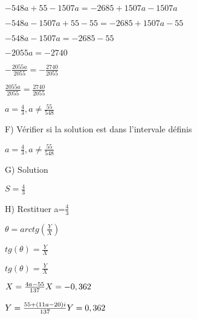 $
-548a+55-1507a = -2685+1507a-1507a
$
\vspace{5mm} %

$
-548a-1507a+55-55 = -2685+1507a-55
$
\vspace{5mm} %

$
-548a-1507a = -2685-55
$
\vspace{5mm} %

$
-2055a = -2740
$
\vspace{5mm} %

$
- \frac{2055a}{2055} = - \frac{2740}{2055}
$
\vspace{5mm} %

$
\frac{2055a}{2055} = \frac{2740}{2055}
$
\vspace{5mm} %

$
a=\frac{4}{3}, a \neq \frac{55}{548}
$
\vspace{10mm} %

F) Vérifier si la solution est dans l'intervale définis \\
\vspace{2mm} %

$
a=\frac{4}{3}, a \neq \frac{55}{548}
$
\vspace{5mm} %


G) Solution \\
\vspace{2mm} %

$
S = \frac{4}{3}
$
\vspace{5mm} %


H) Restituer a=$\frac{4}{3}$ \\
\vspace{2mm} %

$
\theta = arctg(\frac{Y}{X})
$
\vspace{5mm} %

$
tg(\theta) = \frac{Y}{X}
$
\vspace{5mm} %


$
tg(\theta) = \frac{Y}{X}
$
\vspace{5mm} %

$
X = \frac{4a-55}{137}\\
X = -0,362
$
\vspace{5mm} %

$
Y= \frac{55+(11a-20)i}{137}\\
Y= 0,362
$
\vspace{5mm} %

